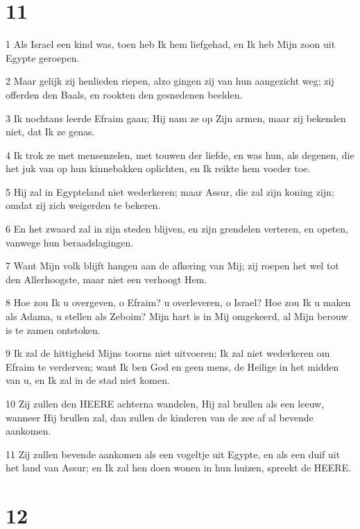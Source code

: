 \chapter{11}

\par 1 Als Israel een kind was, toen heb Ik hem liefgehad, en Ik heb Mijn zoon uit Egypte geroepen.
\par 2 Maar gelijk zij henlieden riepen, alzo gingen zij van hun aangezicht weg; zij offerden den Baals, en rookten den gesnedenen beelden.
\par 3 Ik nochtans leerde Efraim gaan; Hij nam ze op Zijn armen, maar zij bekenden niet, dat Ik ze genas.
\par 4 Ik trok ze met mensenzelen, met touwen der liefde, en was hun, als degenen, die het juk van op hun kinnebakken oplichten, en Ik reikte hem voeder toe.
\par 5 Hij zal in Egypteland niet wederkeren; maar Assur, die zal zijn koning zijn; omdat zij zich weigerden te bekeren.
\par 6 En het zwaard zal in zijn steden blijven, en zijn grendelen verteren, en opeten, vanwege hun beraadslagingen.
\par 7 Want Mijn volk blijft hangen aan de afkering van Mij; zij roepen het wel tot den Allerhoogste, maar niet een verhoogt Hem.
\par 8 Hoe zou Ik u overgeven, o Efraim? u overleveren, o Israel? Hoe zou Ik u maken als Adama, u stellen als Zeboim? Mijn hart is in Mij omgekeerd, al Mijn berouw is te zamen ontstoken.
\par 9 Ik zal de hittigheid Mijns toorns niet uitvoeren; Ik zal niet wederkeren om Efraim te verderven; want Ik ben God en geen mens, de Heilige in het midden van u, en Ik zal in de stad niet komen.
\par 10 Zij zullen den HEERE achterna wandelen, Hij zal brullen als een leeuw, wanneer Hij brullen zal, dan zullen de kinderen van de zee af al bevende aankomen.
\par 11 Zij zullen bevende aankomen als een vogeltje uit Egypte, en als een duif uit het land van Assur; en Ik zal hen doen wonen in hun huizen, spreekt de HEERE.

\chapter{12}

